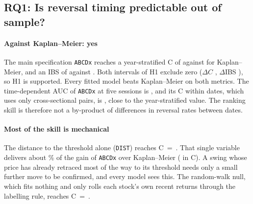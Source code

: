 \subsection{RQ1: Is reversal timing predictable out of sample?}\label{sec:rq1}

\paragraph{Against Kaplan--Meier: yes} The main specification \texttt{ABCDx} reaches a
year-stratified C of \CABCDx{} against \CKm{} for Kaplan--Meier, and an IBS of \IBSABCDx{} against
\IBSKm. Both intervals of H1 exclude zero ($\Delta C$ \PrimDCABCDxKm, $\Delta$IBS
\PrimDIBSABCDxKm), so H1 is supported. Every fitted model beats Kaplan--Meier on both metrics. The time-dependent AUC of \texttt{ABCDx} at five sessions is \AUCFiveABCDx, and its C
within dates, which uses only cross-sectional pairs, is \CDateABCDx, close to the year-stratified
value. The ranking skill is therefore not a by-product of differences in reversal rates between
dates.

\begin{table}[!htbp]
\centering
\caption{Out-of-sample accuracy of every model, test years 2017--2026 (\TestRows{} survival rows).
C: Uno's concordance index truncated at 20 sessions, computed within each test year and summed
(primary). IBS: integrated Brier score over days 1--20, row-weighted mean of the yearly scores
(primary; lower is better). C within dates: concordance over pairs from the same date only.
AUC($h$): time-dependent area under the ROC curve at $h$ sessions, pooled. Pooled C and IBS:
the same metrics computed once over all test rows (secondary). Specification names: blocks A--E as
in Table~\ref{tab:features}; ``x'' adds direction-specific terms; \texttt{MBCx} and
\texttt{MBCDx} replace block A with the age and distance terms of \texttt{M}. Other tables use
short names: prefixes \texttt{cox\_}, \texttt{gbm\_} (boosted hazard), \texttt{rsf\_} (random
survival forest), \texttt{nn\_static\_} and \texttt{nn\_seq\_} (neural, static or sequence);
suffixes \texttt{\_ff} (foreign flows), \texttt{\_bank} (bank rows) and \texttt{\_E} (block
E); KM is Kaplan--Meier.}\label{tab:models}
\footnotesize
{}
\end{table}

\paragraph{Most of the skill is mechanical} The distance to the threshold alone (\texttt{DIST})
reaches C~=~\CDIST. That single variable delivers about \MechShareDIST\% of the gain of \texttt{ABCDx}
over Kaplan--Meier (\GainOverKM{} in C). A swing whose price has already retraced most of the way
to its threshold needs only a small further move to be confirmed, and every model sees this. The
random-walk null, which fits nothing and only rolls each stock's own recent returns through the
labelling rule, reaches C~=~\CRW.


